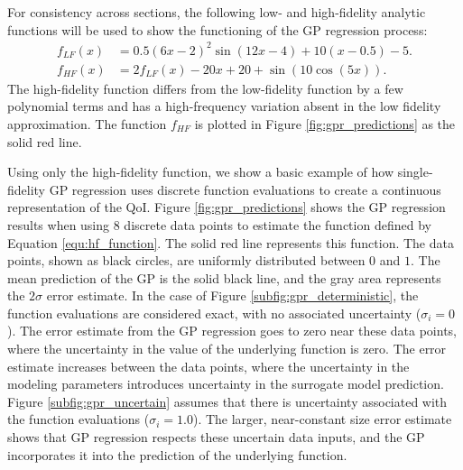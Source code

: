 For consistency across sections, the following low- and high-fidelity analytic functions will be used to show the functioning of the GP regression process: 
\begin{align} \label{equ:lf_function}
    f_{LF}(x) &= 0.5 \left ( 6x - 2\right )^2 \sin{ \left (12x -4 \right )} + 10 \left ( x - 0.5 \right ) -5.
\\ \label{equ:hf_function}
    f_{HF}(x) &= 2 f_{LF}(x) - 20x + 20 + \sin {\left ( 10 \cos{ \left ( 5x \right )}\right )}.
\end{align}
The high-fidelity function differs from the low-fidelity function by a few polynomial terms and has a high-frequency variation absent in the low fidelity approximation. 
The function $f_{HF}$ is plotted in Figure \ref{fig:gpr_predictions} as the solid red line. 

Using only the high-fidelity function, we show a basic example of how single-fidelity GP regression uses discrete function evaluations to create a continuous representation of the QoI.
Figure \ref{fig:gpr_predictions} shows the GP regression results when using 8 discrete data points to estimate the function defined by Equation \ref{equ:hf_function}.
The solid red line represents this function. 
The data points, shown as black circles, are uniformly distributed between $0$ and $1$.
The mean prediction of the GP is the solid black line, and the gray area represents the $2\sigma$ error estimate.
In the case of Figure \ref{subfig:gpr_deterministic}, the function evaluations are considered exact, with no associated uncertainty ($\sigma_i = 0$). 
The error estimate from the GP regression goes to zero near these data points, where the uncertainty in the value of the underlying function is zero. 
The error estimate increases between the data points, where the uncertainty in the modeling parameters introduces uncertainty in the surrogate model prediction. 
Figure \ref{subfig:gpr_uncertain} assumes that there is uncertainty associated with the function evaluations ($\sigma_i = 1.0$).
The larger, near-constant size error estimate shows that GP regression respects these uncertain data inputs, and the GP incorporates it into the prediction of the underlying function.


